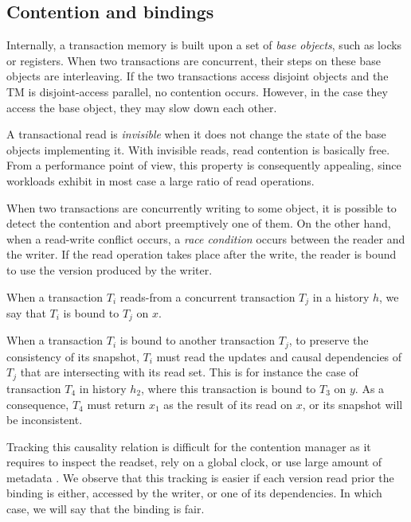 \subsection{Contention and bindings}

Internally, a transaction memory is built upon a set of \emph{base objects}, such as locks or registers.
When two transactions are concurrent, their steps on these base objects are interleaving.
If the two transactions access disjoint objects and the TM is disjoint-access parallel, no contention occurs.
However, in the case they access the base object, they may slow down each other.

A transactional read is \emph{invisible} when it does not change the state of the base objects implementing it.
With invisible reads, read contention is basically free.
From a performance point of view, this property is consequently appealing, since workloads exhibit in most case a large ratio of read operations.

When two transactions are concurrently writing to some object, it is possible to detect the contention and abort preemptively one of them.
On the other hand, when a read-write conflict occurs, a \emph{race condition} occurs between the reader and the writer.
If the read operation takes place after the write, the reader is bound to use the version produced by the writer.

\begin{definition}[Binding]
  When a transaction $T_i$ reads-from a concurrent transaction $T_j$ in a history $h$, we say that $T_i$ is bound to $T_j$ on $x$.
\end{definition}

When a transaction $T_i$ is bound to another transaction $T_j$, to preserve the consistency of its snapshot, $T_i$ must read the updates and causal dependencies of $T_j$ that are intersecting with its read set.
This is for instance the case of transaction $T_4$ in history $h_2$, where this transaction is bound to $T_3$ on $y$.
As a consequence, $T_4$ must return $x_1$ as the result of its read on $x$, or its snapshot will be inconsistent.

Tracking this causality relation is difficult for the contention manager as it requires to inspect the readset, rely on a global clock, or use large amount of metadata \cite{}.
We observe that this tracking is easier if each version read prior the binding is either, accessed by the writer, or one of its dependencies.
In which case, we will say that the binding is fair.

